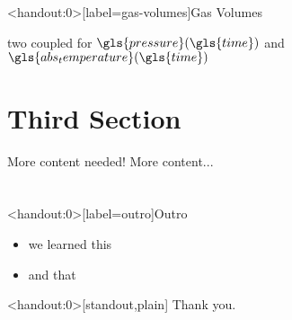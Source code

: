 \documentclass[compress, english]{beamer}%
\begin{document}
\begin{frame}<handout:0>[label=gas-volumes]{Gas Volumes\autocites{eriksson_modeling_2007}[30]{guzzella_introduction_2010}{hendricks_isothermal_2001}{mathworks_constant_2018}}
\centering
\begin{figure}
	\def\svgwidth{0.8\textwidth}
	
\end{figure}
\pause
\textrightarrow{} two coupled  for \(\gls{pressure}(\gls{time})\) and \(\gls{abs_temperature}(\gls{time})\)
\end{frame}
\section{Third Section}
\begin{frame}{More content needed!}
	More content...
\end{frame}
\miniframesoff%
\section*{}
\begin{frame}<handout:0>[label=outro]{Outro}
\begin{itemize}
\item we learned this
\item and that
\end{itemize}
\end{frame}
\begin{frame}<handout:0>[standout,plain]{}
Thank you.
\end{frame}
\setcounter{framenumber}{0}%
\end{document}
